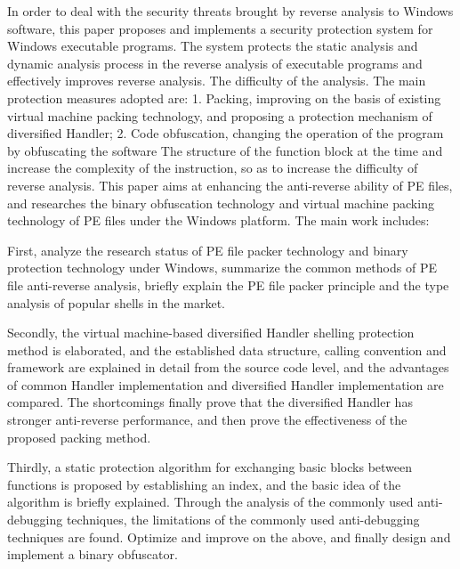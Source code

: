 \begin{eabstract}

In order to deal with the security threats brought by reverse analysis to Windows software, this paper proposes and implements a security protection system for Windows executable programs. The system protects the static analysis and dynamic analysis process in the reverse analysis of executable programs and effectively improves reverse analysis. The difficulty of the analysis. The main protection measures adopted are: 1. Packing, improving on the basis of existing virtual machine packing technology, and proposing a protection mechanism of diversified Handler; 2. Code obfuscation, changing the operation of the program by obfuscating the software The structure of the function block at the time and increase the complexity of the instruction, so as to increase the difficulty of reverse analysis. This paper aims at enhancing the anti-reverse ability of PE files, and researches the binary obfuscation technology and virtual machine packing technology of PE files under the Windows platform. The main work includes:

First, analyze the research status of PE file packer technology and binary protection technology under Windows, summarize the common methods of PE file anti-reverse analysis, briefly explain the PE file packer principle and the type analysis of popular shells in the market.

Secondly, the virtual machine-based diversified Handler shelling protection method is elaborated, and the established data structure, calling convention and framework are explained in detail from the source code level, and the advantages of common Handler implementation and diversified Handler implementation are compared. The shortcomings finally prove that the diversified Handler has stronger anti-reverse performance, and then prove the effectiveness of the proposed packing method.

Thirdly, a static protection algorithm for exchanging basic blocks between functions is proposed by establishing an index, and the basic idea of ​​the algorithm is briefly explained. Through the analysis of the commonly used anti-debugging techniques, the limitations of the commonly used anti-debugging techniques are found. Optimize and improve on the above, and finally design and implement a binary obfuscator.


\end{eabstract}
